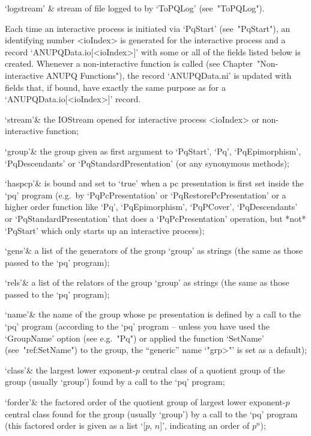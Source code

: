 \quad`logstream' & stream of file logged to by `ToPQLog' (see~"ToPQLog").

\enditems

Each time an interactive {\ANUPQ}  process  is  initiated  via  `PqStart'
(see~"PqStart"), an identifying number <ioIndex>  is  generated  for  the
interactive process and a record `ANUPQData.io[<ioIndex>]' with  some  or
all of the fields listed below is  created.  Whenever  a  non-interactive
function is called (see Chapter~"Non-interactive ANUPQ  Functions"),  the
record `ANUPQData.ni' is updated with fields that, if bound, have exactly
the same purpose as for a `ANUPQData.io[<ioIndex>]' record. 

\beginitems

\quad`stream'& the  IOStream  opened  for  interactive  {\ANUPQ}  process
<ioIndex> or non-interactive {\ANUPQ} function;

\quad`group'& the group given  as  first  argument  to  `PqStart',  `Pq',
`PqEpimorphism',  `PqDescendants'  or  `PqStandardPresentation'  (or  any
synonymous methods);

\quad`haspcp'& is bound and set to `true' when a pc presentation is first
set   inside   the   `pq'   program   (e.g.~by   `PqPcPresentation'    or
`PqRestorePcPresentation'  or  a  higher  order   function   like   `Pq',
`PqEpimorphism', `PqPCover', `PqDescendants' or  `PqStandardPresentation'
that does a `PqPcPresentation' operation, but *not* `PqStart' which  only
starts up an interactive {\ANUPQ} process);

\quad`gens'& a list of the generators of the  group  `group'  as  strings
(the same as those passed to the `pq' program);

\quad`rels'& a list of the relators of the group `group' as strings  (the
same as those passed to the `pq' program);

\quad`name'& the name of the group whose pc presentation is defined by  a
call to the `pq' program (according to the `pq' program -- unless you  have
used the `GroupName' option  (see  e.g.~"Pq")  or  applied  the  function
`SetName'  (see~"ref:SetName")  to  the  group,  the   ``generic''   name
`"\<grp>"' is set as a default);

\quad`class'& the largest lower exponent-$p$ central class of a  quotient
group of the group (usually `group') found by a call to the `pq' program;

\quad`forder'& the factored order of the quotient group of largest  lower
exponent-$p$ central class found for the group  (usually  `group')  by  a
call to the `pq' program (this factored order is given as  a  list  `[$p$,
$n$]', indicating an order of $p^n$);

